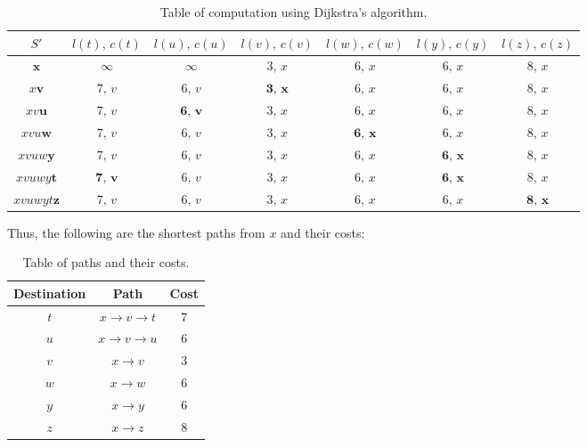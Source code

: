 \documentclass{article}
\begin{document}
\begin{table}[h!]
\centering
\begin{tabular}{|c|c|c|c|c|c|c|}
\hline
    $S'$ & $l(t), \, c(t)$ & $l(u), \, c(u)$ & $l(v), \, c(v)$ & $l(w), \, c(w)$ & $l(y), \, c(y)$ & $l(z), \, c(z)$ \\ \hline
    $ \boldsymbol{x} $ & $ \infty $ & $ \infty $ & $3, \, x$ & $6, \, x$ & $6, \, x$ & $8, \, x$ \\
    \hline
    $ x\boldsymbol{v} $ & $ 7, \, v $ & $ 6, \, v $ & $ \boldsymbol{3, \, x}$ & $6, \, x$ & $6, \, x$ & $8, \, x$ \\
    \hline
    $ xv\boldsymbol{u} $ & $ 7, \, v $ & $ \boldsymbol{6, \, v} $ & $3, \, x$ & $6, \, x$ & $6, \, x$ & $8, \, x$ \\
    \hline
    $ xvu\boldsymbol{w} $ & $ 7, \, v $ & $ 6, \, v $ & $3, \, x$ & $\boldsymbol{6, \, x}$ & $6, \, x$ & $8, \, x$ \\
    \hline
    $ xvuw\boldsymbol{y} $ & $ 7, \, v $ & $ 6, \, v $ & $3, \, x$ & $6, \, x$ & $\boldsymbol{6, \, x}$ & $8, \, x$ \\
    \hline
    $ xvuwy\boldsymbol{t} $ & $ \boldsymbol{7, \, v} $ & $ 6, \, v $ & $3, \, x$ & $6, \, x$ & $\boldsymbol{6, \, x}$ & $8, \, x$ \\
    \hline
    $ xvuwyt\boldsymbol{z} $ & $ 7, \, v $ & $ 6, \, v $ & $3, \, x$ & $6, \, x$ & $6, \, x$ & $\boldsymbol{8, \, x}$ \\
    \hline
\end{tabular}
\caption{Table of computation using Dijkstra's algorithm.}
\end{table}
Thus, the following are the shortest paths from $ x $ and their costs:
\begin{table}[h!]
\centering
    \begin{tabular}{|c|c|c|}
        \hline
        Destination & Path & Cost \\
        \hline
        $t$ & $ x \rightarrow v \rightarrow t $ & $ 7 $ \\
        \hline
        $u$ & $ x \rightarrow v \rightarrow u $ & $ 6 $ \\
        \hline
        $v$ & $ x \rightarrow v $ & $ 3 $ \\
        \hline
        $w$ & $ x \rightarrow w $ & $ 6 $ \\
        \hline
        $y$ & $ x \rightarrow y $ & $ 6 $ \\
        \hline
        $z$ & $ x \rightarrow z $ & $ 8 $ \\
        \hline
    \end{tabular}
\caption{Table of paths and their costs.}
\end{table}
\end{document}
